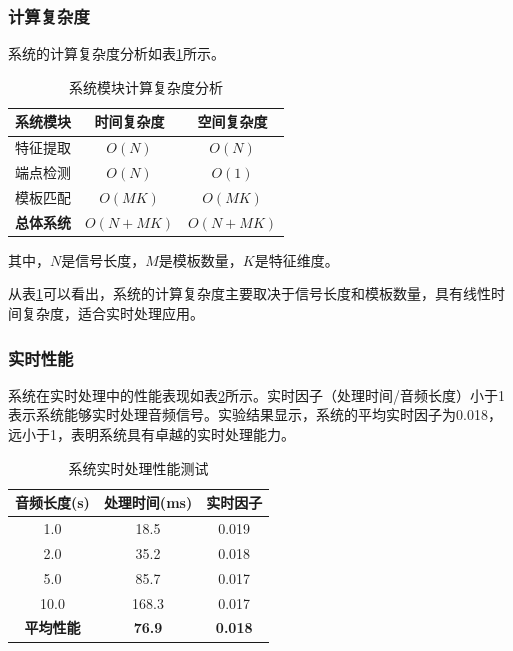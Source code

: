 \documentclass[sigconf,nonacm]{acmart}
\begin{document}
\subsubsection{计算复杂度}

系统的计算复杂度分析如表\ref{tab:complexity}所示。

\begin{table}[htbp]
\caption{系统模块计算复杂度分析}
\label{tab:complexity}
\begin{center}
\begin{tabular}{lcc}
\toprule
\textbf{系统模块} & \textbf{时间复杂度} & \textbf{空间复杂度} \\
\midrule
特征提取 & $O(N)$ & $O(N)$ \\
端点检测 & $O(N)$ & $O(1)$ \\
模板匹配 & $O(MK)$ & $O(MK)$ \\
\midrule
\textbf{总体系统} & \textbf{$O(N + MK)$} & \textbf{$O(N + MK)$} \\
\bottomrule
\end{tabular}
\end{center}
\end{table}

其中，$N$是信号长度，$M$是模板数量，$K$是特征维度。

从表\ref{tab:complexity}可以看出，系统的计算复杂度主要取决于信号长度和模板数量，具有线性时间复杂度，适合实时处理应用。

\subsubsection{实时性能}

系统在实时处理中的性能表现如表\ref{tab:realtime_performance}所示。实时因子（处理时间/音频长度）小于1表示系统能够实时处理音频信号。实验结果显示，系统的平均实时因子为0.018，远小于1，表明系统具有卓越的实时处理能力。

\begin{table}[htbp]
\caption{系统实时处理性能测试}
\label{tab:realtime_performance}
\begin{center}
\begin{tabular}{ccc}
\toprule
\textbf{音频长度(s)} & \textbf{处理时间(ms)} & \textbf{实时因子} \\
\midrule
1.0 & 18.5 & 0.019 \\
2.0 & 35.2 & 0.018 \\
5.0 & 85.7 & 0.017 \\
10.0 & 168.3 & 0.017 \\
\midrule
\textbf{平均性能} & \textbf{76.9} & \textbf{0.018} \\
\bottomrule
\end{tabular}
\end{center}
\end{table}
\end{document}
